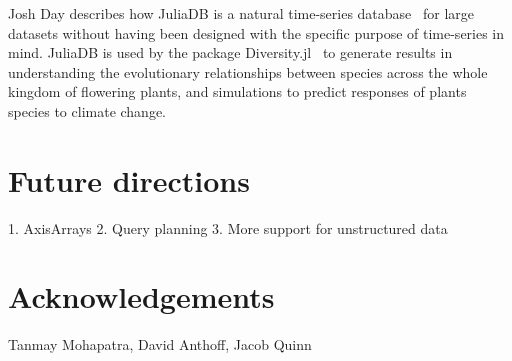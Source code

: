 \documentclass{juliacon}
\begin{document}
Josh Day describes how JuliaDB is a natural time-series database~\cite{wilmott2018} for large datasets without having been designed with the specific purpose of time-series in mind. JuliaDB is used by the package Diversity.jl~\cite{claireh2018} to generate results in understanding the evolutionary relationships between species across the whole kingdom of flowering plants, and simulations to predict responses of plants species to climate change.

\section{Future directions}

1. AxisArrays
2. Query planning
3. More support for unstructured data

\section{Acknowledgements}

Tanmay Mohapatra, David Anthoff, Jacob Quinn


\end{document}
